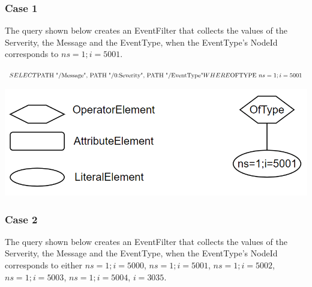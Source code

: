 \documentclass[10pt]{scrreprt}
\begin{document}
\subsubsection*{Case 1}
The query shown below creates an EventFilter that collects the values of the Serverity, the Message and the EventType, when the EventType's NodeId corresponds to $ns=1;i=5001$.


\begin{addmargin}[125pt]{0pt}
    $
    SELECT \newline
    \text{PATH "/Message", PATH "/0:Severity", PATH "/EventType"} \newline
    WHERE \newline
    \text{OFTYPE } ns=1;i=5001
    $
\end{addmargin}


\includegraphics[width=\textwidth]{case_1.png}
\begin{table}[h]
    \centering
    \caption{\textbf{Case 1}}
    \label{tab:Case_1}
\end{table}

\subsubsection*{Case 2}

The query shown below creates an EventFilter that collects the values of the Serverity, the Message and the EventType, when the EventType's NodeId corresponds to either $ns=1;i=5000$, $ns=1;i=5001$, $ns=1;i=5002$, $ns=1;i=5003$, $ns=1;i=5004$, $i=3035$.
\end{document}
